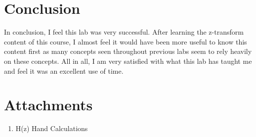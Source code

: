 \documentclass[12pt]{report}
\begin{document}
\section{Conclusion}
In conclusion, I feel this lab was very successful. After learning the z-transform content of this course, I almost feel it would have
been more useful to know this content first as many concepts seen throughout previous labs seem to rely heavily on these concepts.
All in all, I am very satisfied with what this lab has taught me and feel it was an excellent use of time.
\newpage
\thispagestyle{customblank}
\section{Attachments}\label{section: Attachments}
\centering\begin{enumerate}
  \item H(z) Hand Calculations
\end{enumerate}
\vspace*{\fill}


% 


\end{document}

